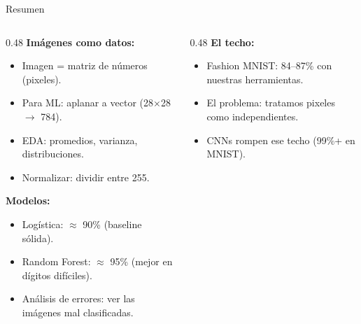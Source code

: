 \documentclass[aspectratio=169, 11pt]{beamer}
\begin{document}
\begin{frame}[shrink=10]{Resumen}
  \vspace{-4pt}
  \begin{columns}[T]
    \begin{column}{0.48\textwidth}
      {\footnotesize\bfseries\color{arcaDark} Im\'agenes como datos:}
      \vspace{4pt}

      {\footnotesize
      \begin{itemize}\setlength{\itemsep}{3pt}
        \item[{\color{codeGreen}\faCheckCircle}]
          Imagen = matriz de n\'umeros (pixeles).
        \item[{\color{codeGreen}\faCheckCircle}]
          Para ML: aplanar a vector (28$\times$28 $\to$ 784).
        \item[{\color{codeGreen}\faCheckCircle}]
          EDA: promedios, varianza, distribuciones.
        \item[{\color{codeGreen}\faCheckCircle}]
          Normalizar: dividir entre 255.
      \end{itemize}
      }

      \vspace{4pt}
      {\footnotesize\bfseries\color{codeBlue} Modelos:}
      \vspace{4pt}

      {\footnotesize
      \begin{itemize}\setlength{\itemsep}{3pt}
        \item[{\color{codeGreen}\faCheckCircle}]
          Log\'istica: $\approx$ 90\% (baseline s\'olida).
        \item[{\color{codeGreen}\faCheckCircle}]
          Random Forest: $\approx$ 95\% (mejor en d\'igitos dif\'iciles).
        \item[{\color{codeGreen}\faCheckCircle}]
          An\'alisis de errores: ver las im\'agenes mal clasificadas.
      \end{itemize}
      }
    \end{column}

    \begin{column}{0.48\textwidth}
      {\footnotesize\bfseries\color{arcaRed} El techo:}
      \vspace{4pt}

      {\footnotesize
      \begin{itemize}\setlength{\itemsep}{3pt}
        \item[{\color{codeGreen}\faCheckCircle}]
          Fashion MNIST: 84--87\% con nuestras herramientas.
        \item[{\color{codeGreen}\faCheckCircle}]
          El problema: tratamos pixeles como independientes.
        \item[{\color{codeGreen}\faCheckCircle}]
          CNNs rompen ese techo (99\%+ en MNIST).
      \end{itemize}
      }


\end{column}
\end{columns}
\end{frame}
\end{document}
